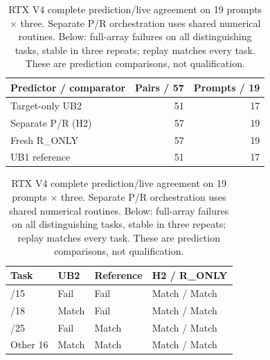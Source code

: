 \begin{table}[t]
\caption{RTX V4 complete prediction/live agreement on 19 prompts $\times$ three. Separate P/R orchestration uses shared numerical routines. Below: full-array failures on all distinguishing tasks, stable in three repeats; replay matches every task. These are prediction comparisons, not qualification.}
\label{tab:rtxv4trajectory}
\centering
\begin{tabular}{@{}lrr@{}}
\toprule
Predictor / comparator & Pairs / 57 & Prompts / 19 \\
\midrule
Target-only UB2 & 51 & 17 \\
Separate P/R (H2) & 57 & 19 \\
Fresh R\_ONLY & 57 & 19 \\
UB1 reference & 51 & 17 \\
\bottomrule
\end{tabular}
\par\smallskip
\begin{tabular}{@{}llll@{}}
\toprule
Task & UB2 & Reference & H2 / R\_ONLY \\
\midrule
/15 & Fail & Fail & Match / Match \\
/18 & Match & Fail & Match / Match \\
/25 & Fail & Match & Match / Match \\
Other 16 & Match & Match & Match / Match \\
\bottomrule
\end{tabular}
\end{table}
